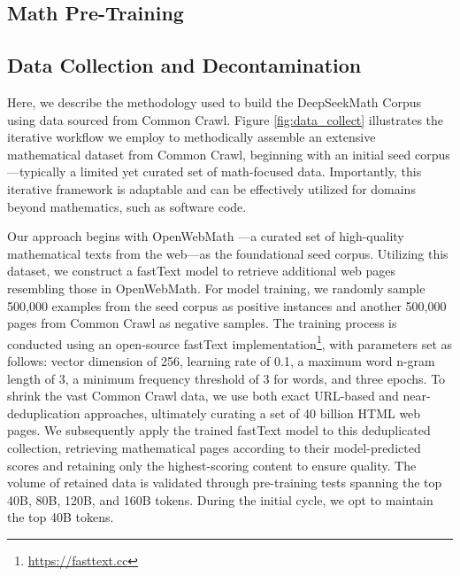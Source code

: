 \begin{itemize}[topsep=0pt]
\section{Math Pre-Training}

\subsection{Data Collection and Decontamination} 

Here, we describe the methodology used to build the DeepSeekMath Corpus using data sourced from Common Crawl. Figure \ref{fig:data_collect} illustrates the iterative workflow we employ to methodically assemble an extensive mathematical dataset from Common Crawl, beginning with an initial seed corpus—typically a limited yet curated set of math-focused data. Importantly, this iterative framework is adaptable and can be effectively utilized for domains beyond mathematics, such as software code.

Our approach begins with OpenWebMath \citep{openwebmath}—a curated set of high-quality mathematical texts from the web—as the foundational seed corpus. Utilizing this dataset, we construct a fastText model \citep{joulin2016fasttext} to retrieve additional web pages resembling those in OpenWebMath. For model training, we randomly sample 500,000 examples from the seed corpus as positive instances and another 500,000 pages from Common Crawl as negative samples. The training process is conducted using an open-source fastText implementation\footnote{\url{https://fasttext.cc}}, with parameters set as follows: vector dimension of 256, learning rate of 0.1, a maximum word n-gram length of 3, a minimum frequency threshold of 3 for words, and three epochs. To shrink the vast Common Crawl data, we use both exact URL-based and near-deduplication approaches, ultimately curating a set of 40 billion HTML web pages. We subsequently apply the trained fastText model to this deduplicated collection, retrieving mathematical pages according to their model-predicted scores and retaining only the highest-scoring content to ensure quality. The volume of retained data is validated through pre-training tests spanning the top 40B, 80B, 120B, and 160B tokens. During the initial cycle, we opt to maintain the top 40B tokens.


\end{itemize}
